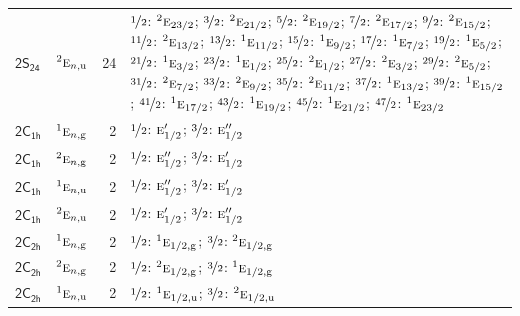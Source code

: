 \documentclass[10pt,a4paper]{article}
\numberwithin{equation}{section}
\newcommand{\grp}[1]{\mathsf{#1}}
\newcommand{\irr}[1]{\text{\normalfont\scshape #1}}
\newcommand{\conjpair}[1]{{}^{#1}}
\newcommand{\ptag}[1]{\mathrm{#1}}
\newlength{\fillwidth}\newlength{\cellwidth}\newlength{\colwidth}
\begin{document}
{\begin{longtable}{@{}llr>{\RaggedRight\arraybackslash}p{\fillwidth}@{}}
\href{2S24.pdf}{$\grp{2S_{24}}$} & $\conjpair{2}\irr{e}_{n,\ptag{u}}$ & 24 & $\nicefrac{1}{2}$: $\conjpair{2}\irr{e}_{23/2}$; $\nicefrac{3}{2}$: $\conjpair{2}\irr{e}_{21/2}$; $\nicefrac{5}{2}$: $\conjpair{2}\irr{e}_{19/2}$; $\nicefrac{7}{2}$: $\conjpair{2}\irr{e}_{17/2}$; $\nicefrac{9}{2}$: $\conjpair{2}\irr{e}_{15/2}$; $\nicefrac{11}{2}$: $\conjpair{2}\irr{e}_{13/2}$; $\nicefrac{13}{2}$: $\conjpair{1}\irr{e}_{11/2}$; $\nicefrac{15}{2}$: $\conjpair{1}\irr{e}_{9/2}$; $\nicefrac{17}{2}$: $\conjpair{1}\irr{e}_{7/2}$; $\nicefrac{19}{2}$: $\conjpair{1}\irr{e}_{5/2}$; $\nicefrac{21}{2}$: $\conjpair{1}\irr{e}_{3/2}$; $\nicefrac{23}{2}$: $\conjpair{1}\irr{e}_{1/2}$; $\nicefrac{25}{2}$: $\conjpair{2}\irr{e}_{1/2}$; $\nicefrac{27}{2}$: $\conjpair{2}\irr{e}_{3/2}$; $\nicefrac{29}{2}$: $\conjpair{2}\irr{e}_{5/2}$; $\nicefrac{31}{2}$: $\conjpair{2}\irr{e}_{7/2}$; $\nicefrac{33}{2}$: $\conjpair{2}\irr{e}_{9/2}$; $\nicefrac{35}{2}$: $\conjpair{2}\irr{e}_{11/2}$; $\nicefrac{37}{2}$: $\conjpair{1}\irr{e}_{13/2}$; $\nicefrac{39}{2}$: $\conjpair{1}\irr{e}_{15/2}$; $\nicefrac{41}{2}$: $\conjpair{1}\irr{e}_{17/2}$; $\nicefrac{43}{2}$: $\conjpair{1}\irr{e}_{19/2}$; $\nicefrac{45}{2}$: $\conjpair{1}\irr{e}_{21/2}$; $\nicefrac{47}{2}$: $\conjpair{1}\irr{e}_{23/2}$\\
\href{2C1h.pdf}{$\grp{2C_{1h}}$} & $\conjpair{1}\irr{e}_{n,\ptag{g}}$ & 2 & $\nicefrac{1}{2}$: $\irr{e}_{1/2}'$; $\nicefrac{3}{2}$: $\irr{e}_{1/2}''$\\
\href{2C1h.pdf}{$\grp{2C_{1h}}$} & $\conjpair{2}\irr{e}_{n,\ptag{g}}$ & 2 & $\nicefrac{1}{2}$: $\irr{e}_{1/2}''$; $\nicefrac{3}{2}$: $\irr{e}_{1/2}'$\\
\href{2C1h.pdf}{$\grp{2C_{1h}}$} & $\conjpair{1}\irr{e}_{n,\ptag{u}}$ & 2 & $\nicefrac{1}{2}$: $\irr{e}_{1/2}''$; $\nicefrac{3}{2}$: $\irr{e}_{1/2}'$\\
\href{2C1h.pdf}{$\grp{2C_{1h}}$} & $\conjpair{2}\irr{e}_{n,\ptag{u}}$ & 2 & $\nicefrac{1}{2}$: $\irr{e}_{1/2}'$; $\nicefrac{3}{2}$: $\irr{e}_{1/2}''$\\
\href{2C2h.pdf}{$\grp{2C_{2h}}$} & $\conjpair{1}\irr{e}_{n,\ptag{g}}$ & 2 & $\nicefrac{1}{2}$: $\conjpair{1}\irr{e}_{1/2,\ptag{g}}$; $\nicefrac{3}{2}$: $\conjpair{2}\irr{e}_{1/2,\ptag{g}}$\\
\href{2C2h.pdf}{$\grp{2C_{2h}}$} & $\conjpair{2}\irr{e}_{n,\ptag{g}}$ & 2 & $\nicefrac{1}{2}$: $\conjpair{2}\irr{e}_{1/2,\ptag{g}}$; $\nicefrac{3}{2}$: $\conjpair{1}\irr{e}_{1/2,\ptag{g}}$\\
\href{2C2h.pdf}{$\grp{2C_{2h}}$} & $\conjpair{1}\irr{e}_{n,\ptag{u}}$ & 2 & $\nicefrac{1}{2}$: $\conjpair{1}\irr{e}_{1/2,\ptag{u}}$; $\nicefrac{3}{2}$: $\conjpair{2}\irr{e}_{1/2,\ptag{u}}$\\

\end{longtable}}
\end{document}
